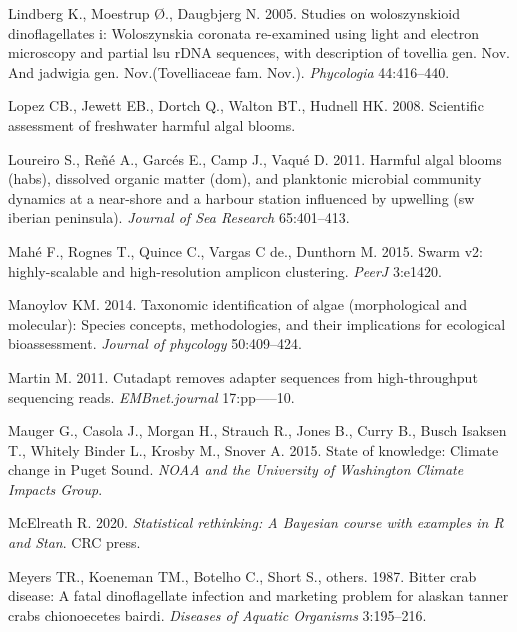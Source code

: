 \documentclass[
]{article}
\begin{document}
\leavevmode\hypertarget{ref-lindberg2005studies}{}%
Lindberg K., Moestrup Ø., Daugbjerg N. 2005. Studies on woloszynskioid
dinoflagellates i: Woloszynskia coronata re-examined using light and
electron microscopy and partial lsu rDNA sequences, with description of
tovellia gen. Nov. And jadwigia gen. Nov.(Tovelliaceae fam. Nov.).
\emph{Phycologia} 44:416--440.

\leavevmode\hypertarget{ref-lopez2008scientific}{}%
Lopez CB., Jewett EB., Dortch Q., Walton BT., Hudnell HK. 2008.
Scientific assessment of freshwater harmful algal blooms.

\leavevmode\hypertarget{ref-loureiro2011harmful}{}%
Loureiro S., Reñé A., Garcés E., Camp J., Vaqué D. 2011. Harmful algal
blooms (habs), dissolved organic matter (dom), and planktonic microbial
community dynamics at a near-shore and a harbour station influenced by
upwelling (sw iberian peninsula). \emph{Journal of Sea Research}
65:401--413.

\leavevmode\hypertarget{ref-mahe2015swarm}{}%
Mahé F., Rognes T., Quince C., Vargas C de., Dunthorn M. 2015. Swarm v2:
highly-scalable and high-resolution amplicon clustering. \emph{PeerJ}
3:e1420.

\leavevmode\hypertarget{ref-manoylov2014taxonomic}{}%
Manoylov KM. 2014. Taxonomic identification of algae (morphological and
molecular): Species concepts, methodologies, and their implications for
ecological bioassessment. \emph{Journal of phycology} 50:409--424.

\leavevmode\hypertarget{ref-martin2011cutadapt}{}%
Martin M. 2011. Cutadapt removes adapter sequences from high-throughput
sequencing reads. \emph{EMBnet.journal} 17:pp-----10.

\leavevmode\hypertarget{ref-mauger2015state}{}%
Mauger G., Casola J., Morgan H., Strauch R., Jones B., Curry B., Busch
Isaksen T., Whitely Binder L., Krosby M., Snover A. 2015. State of
knowledge: Climate change in Puget Sound. \emph{NOAA and the University
of Washington Climate Impacts Group}.

\leavevmode\hypertarget{ref-mcelreath2020statistical}{}%
McElreath R. 2020. \emph{Statistical rethinking: A Bayesian course with
examples in R and Stan}. CRC press.

\leavevmode\hypertarget{ref-meyers1987bitter}{}%
Meyers TR., Koeneman TM., Botelho C., Short S., others. 1987. Bitter
crab disease: A fatal dinoflagellate infection and marketing problem for
alaskan tanner crabs chionoecetes bairdi. \emph{Diseases of Aquatic
Organisms} 3:195--216.
\end{document}
